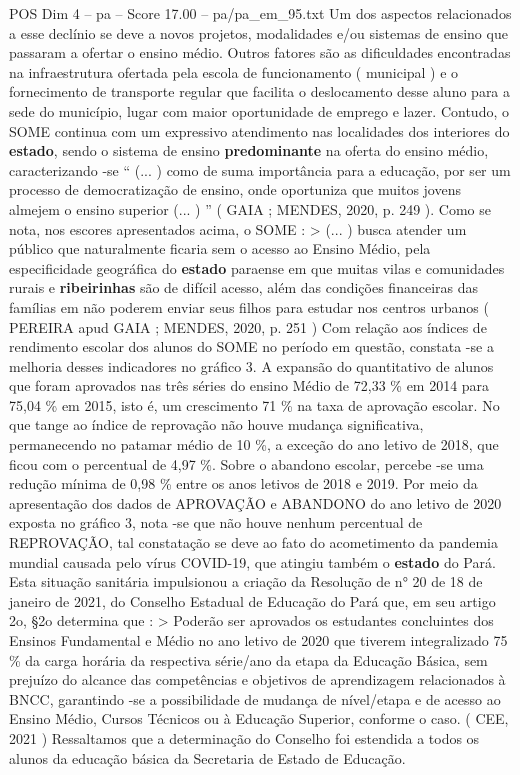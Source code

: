 \begin{textsample}{POS Dim 4 – pa – Score 17.00 – pa/pa\_em\_95.txt}  \label{ex:f4_pos_004}
Um dos aspectos relacionados a esse declínio se deve a novos projetos, modalidades e/ou sistemas de ensino que passaram a ofertar o ensino médio.
Outros fatores são as dificuldades encontradas na infraestrutura ofertada pela escola de funcionamento ( municipal ) e o fornecimento de transporte regular que facilita o deslocamento desse aluno para a sede do município, lugar com maior oportunidade de emprego e lazer.
Contudo, o SOME continua com um expressivo atendimento nas localidades dos interiores do \textbf{estado}, sendo o sistema de ensino \textbf{predominante} na oferta do ensino médio, caracterizando -se “ (... ) como de suma importância para a educação, por ser um processo de democratização de ensino, onde oportuniza que muitos jovens almejem o ensino superior (... ) ” ( GAIA ; MENDES, 2020, p. 249 ).
Como se nota, nos escores apresentados acima, o SOME : > (... ) busca atender um público que naturalmente ficaria sem o acesso ao Ensino Médio, pela especificidade geográfica do \textbf{estado} paraense em que muitas vilas e comunidades rurais e \textbf{ribeirinhas} são de difícil acesso, além das condições financeiras das famílias em não poderem enviar seus filhos para estudar nos centros urbanos ( PEREIRA apud GAIA ; MENDES, 2020, p. 251 ) Com relação aos índices de rendimento escolar dos alunos do SOME no período em questão, constata -se a melhoria desses indicadores no gráfico 3.
A expansão do quantitativo de alunos que foram aprovados nas três séries do ensino Médio de 72,33 \% em 2014 para 75,04 \% em 2015, isto é, um crescimento 71 \% na taxa de aprovação escolar.
No que tange ao índice de reprovação não houve mudança significativa, permanecendo no patamar médio de 10 \%, a exceção do ano letivo de 2018, que ficou com o percentual de 4,97 \%.
Sobre o abandono escolar, percebe -se uma redução mínima de 0,98 \% entre os anos letivos de 2018 e 2019.
Por meio da apresentação dos dados de APROVAÇÃO e ABANDONO do ano letivo de 2020 exposta no gráfico 3, nota -se que não houve nenhum percentual de REPROVAÇÃO, tal constatação se deve ao fato do acometimento da pandemia mundial causada pelo vírus COVID-19, que atingiu também o \textbf{estado} do Pará.
Esta situação sanitária impulsionou a criação da Resolução de n{\EmojiFont °} 20 de 18 de janeiro de 2021, do Conselho Estadual de Educação do Pará que, em seu artigo 2o, §2o determina que : > Poderão ser aprovados os estudantes concluintes dos Ensinos Fundamental e Médio no ano letivo de 2020 que tiverem integralizado 75 \% da carga horária da respectiva série/ano da etapa da Educação Básica, sem prejuízo do alcance das competências e objetivos de aprendizagem relacionados à BNCC, garantindo -se a possibilidade de mudança de nível/etapa e de acesso ao Ensino Médio, Cursos Técnicos ou à Educação Superior, conforme o caso. ( CEE, 2021 ) Ressaltamos que a determinação do Conselho foi estendida a todos os alunos da educação básica da Secretaria de Estado de Educação.

\end{textsample}
